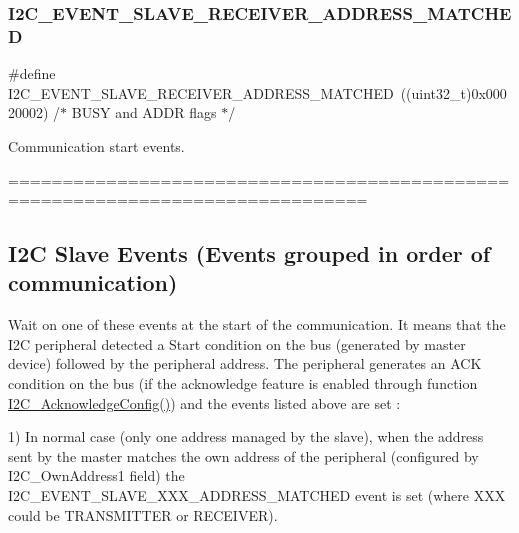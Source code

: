 \subsubsection{\texorpdfstring{I2\+C\+\_\+\+E\+V\+E\+N\+T\+\_\+\+S\+L\+A\+V\+E\+\_\+\+R\+E\+C\+E\+I\+V\+E\+R\+\_\+\+A\+D\+D\+R\+E\+S\+S\+\_\+\+M\+A\+T\+C\+H\+ED}{I2C\_EVENT\_SLAVE\_RECEIVER\_ADDRESS\_MATCHED}}
{\footnotesize\ttfamily \#define I2\+C\+\_\+\+E\+V\+E\+N\+T\+\_\+\+S\+L\+A\+V\+E\+\_\+\+R\+E\+C\+E\+I\+V\+E\+R\+\_\+\+A\+D\+D\+R\+E\+S\+S\+\_\+\+M\+A\+T\+C\+H\+ED~((uint32\+\_\+t)0x00020002) /$\ast$ B\+U\+S\+Y and A\+D\+D\+R flags $\ast$/}



Communication start events. 

=============================================================================== \subsection*{I2C Slave Events (Events grouped in order of communication) }

Wait on one of these events at the start of the communication. It means that the I2C peripheral detected a Start condition on the bus (generated by master device) followed by the peripheral address. The peripheral generates an A\+CK condition on the bus (if the acknowledge feature is enabled through function \mbox{\hyperlink{group___i2_c_ga7bb44e894d68a7991f564c43fb187486}{I2\+C\+\_\+\+Acknowledge\+Config()}}) and the events listed above are set \+:

1) In normal case (only one address managed by the slave), when the address sent by the master matches the own address of the peripheral (configured by I2\+C\+\_\+\+Own\+Address1 field) the I2\+C\+\_\+\+E\+V\+E\+N\+T\+\_\+\+S\+L\+A\+V\+E\+\_\+\+X\+X\+X\+\_\+\+A\+D\+D\+R\+E\+S\+S\+\_\+\+M\+A\+T\+C\+H\+ED event is set (where X\+XX could be T\+R\+A\+N\+S\+M\+I\+T\+T\+ER or R\+E\+C\+E\+I\+V\+ER).

